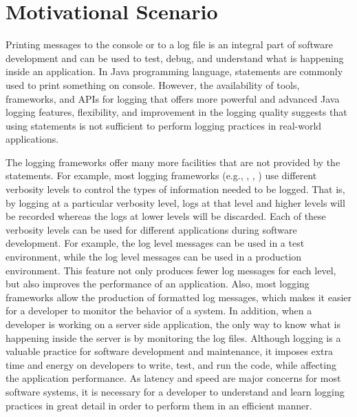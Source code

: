 \chapter{Motivational Scenario}  \label{ch2}

Printing messages to the console or to a log file is an integral part of software development and can be used to test, debug, and understand what is happening inside an application. In Java programming language,  statements are commonly used to print something on console. However, the availability of tools, frameworks, and APIs for logging that offers more powerful and advanced Java logging features, flexibility, and improvement in the logging quality suggests that using  statements is not sufficient to perform logging practices in real-world applications.

The logging frameworks offer many more facilities that are not provided by the  statements. For example, most logging frameworks (e.g., , , ) use different verbosity levels to control the types of information needed to be logged. That is, by logging at a particular verbosity level, logs at that level and higher levels will be recorded whereas the logs at lower levels will be discarded. Each of these verbosity levels can be used for different applications during software development. For example, the  log level messages can be used in a test environment, while the  log level messages can be used in a production environment. This feature not only produces fewer log messages for each level, but also improves the performance of an application. Also, most logging frameworks allow the production of formatted log messages, which makes it easier for a developer to monitor the behavior of a system. In addition, when a developer is working on a server side application, the only way to know what is happening inside the server is by monitoring the log files. Although logging is a valuable practice for software development and maintenance, it imposes extra time and energy on developers to write, test, and run the code, while affecting the application performance. As latency and speed are major concerns for most software systems, it is necessary for a developer to understand and learn logging practices in great detail in order to perform them in an efficient manner.

